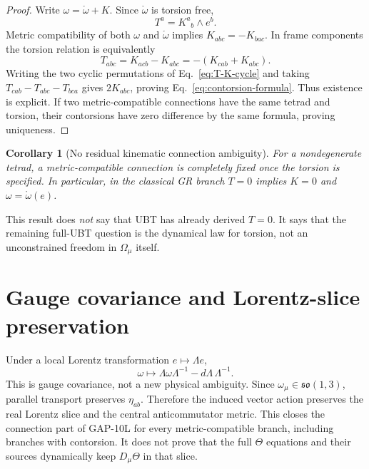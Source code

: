 \documentclass[12pt,a4paper]{article}
\newtheorem{corollary}[definition]{Corollary}
\theoremstyle{remark}\newtheorem{remark}[definition]{Remark}
\begin{document}
\begin{proof}
Write $\omega=\mathring\omega+K$.  Since $\mathring\omega$ is torsion free,
\begin{equation}
 T^a=K^a{}_b\wedge e^b.
\end{equation}
Metric compatibility of both $\omega$ and $\mathring\omega$ implies
$K_{abc}=-K_{bac}$.  In frame components the torsion relation is equivalently
\begin{equation}
 T_{abc}=K_{acb}-K_{abc}=-(K_{cab}+K_{abc}).
 \label{eq:T-K-cycle}
\end{equation}
Writing the two cyclic permutations of Eq.~\eqref{eq:T-K-cycle} and taking
$T_{cab}-T_{abc}-T_{bca}$ gives $2K_{abc}$, proving
Eq.~\eqref{eq:contorsion-formula}.  Thus existence is explicit.  If two
metric-compatible connections have the same tetrad and torsion, their
contorsions have zero difference by the same formula, proving uniqueness.
\end{proof}

\begin{corollary}[No residual kinematic connection ambiguity]
\label{cor:no-independent-omega}
For a nondegenerate tetrad, a metric-compatible connection is completely fixed
once the torsion is specified.  In particular, in the classical GR branch
$T=0$ implies $K=0$ and $\omega=\mathring\omega(e)$.
\end{corollary}

This result does \emph{not} say that UBT has already derived $T=0$.  It says
that the remaining full-UBT question is the dynamical law for torsion, not an
unconstrained freedom in $\Omega_\mu$ itself.

\section{Gauge covariance and Lorentz-slice preservation}
Under a local Lorentz transformation $e\mapsto\Lambda e$,
\begin{equation}
 \omega\mapsto\Lambda\omega\Lambda^{-1}-d\Lambda\,\Lambda^{-1}.
\end{equation}
This is gauge covariance, not a new physical ambiguity.  Since
$\omega_\mu\in\mathfrak{so}(1,3)$, parallel transport preserves
$\eta_{ab}$.  Therefore the induced vector action preserves the real Lorentz
slice and the central anticommutator metric.  This closes the connection part
of GAP-10L for every metric-compatible branch, including branches with
contorsion.  It does not prove that the full $\Theta$ equations and their
sources dynamically keep $D_\mu\Theta$ in that slice.
\end{document}
